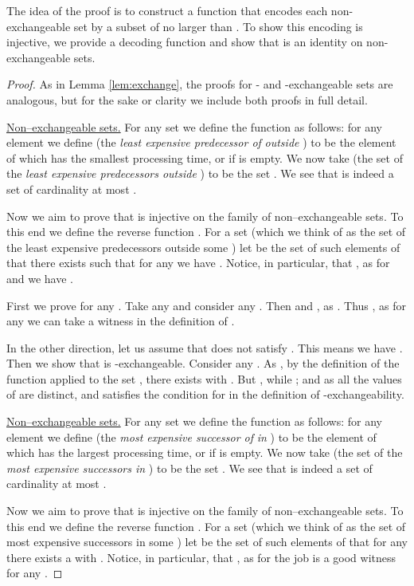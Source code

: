 \documentclass{article}
\theoremstyle{definition}
\begin{document}
The idea of the proof is to construct a function  that encodes each non-exchangeable set
by a subset of  no larger than .
To show this encoding is injective, we provide a decoding function  and show that
 is an identity on non-exchangeable sets.

\begin{proof}
As in Lemma \ref{lem:exchange}, the proofs for - and -exchangeable sets are analogous,
but for the sake or clarity we include both proofs in full detail.

{\underline{Non--exchangeable sets.}} 
For any set  we define the function 
 as follows:
for any element  we define  
(the {\em least expensive predecessor of}  {\em outside} ) to be the element of
 which has the smallest processing time,
or  if  is empty.
We now take  (the set of the {\em least expensive predecessors outside })
to be the set .
We see that  is indeed a set of cardinality at most .

Now we aim to prove that
 is injective on the family of non--exchangeable sets.
To this end we define the reverse function . For a set 
(which we think of as the set of the least expensive predecessors outside some )
let  be the set of such elements  of 
that there exists  such that for any  we have
. 
Notice, in particular, that , as for  and  we have .

First we prove  for any .
Take any  and consider any .
Then   and ,
as .
Thus , as for any  we can take a witness 
in the definition of .

In the other direction, let us assume that  does not satisfy .
This means we have .
Then we show that  is -exchangeable.
Consider any .
As , by the definition of the function  applied to the set ,
there exists  with
. But , while ;
and as all the values of  are distinct, 
and  satisfies the condition for  in the definition of
-exchangeability.

{\underline{Non--exchangeable sets.}}
For any set  we define the function 
 as follows:
for any element  we define  
(the {\em most expensive successor of}  {\em in} ) to be the element of
 which has the largest processing time,
or  if  is empty.
We now take  (the set of the {\em most expensive successors in })
to be the set .
We see that  is indeed a set of cardinality at most .

Now we aim to prove that  is injective on the family of non--exchangeable sets.
To this end we define the reverse function . For a set 
(which we think of as the set of most expensive successors in some )
let  be the set of such elements  of 
that for any  there exists a  with
. 
Notice, in particular, that , as for  the job  is a good witness for any .


\end{proof}
\end{document}
